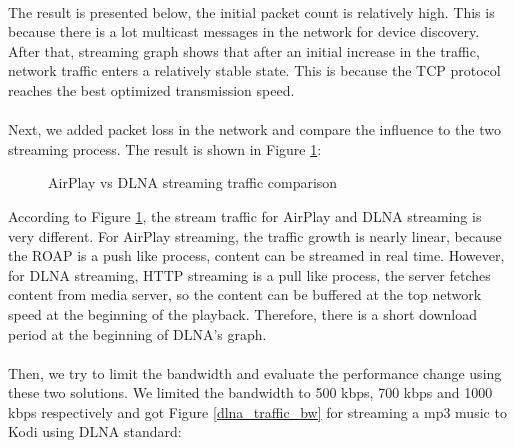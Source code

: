\\
The result is presented below, the initial packet count is relatively high. This is because there is a lot multicast messages in the network for device discovery. After that, streaming graph shows that after an initial increase in the traffic, network traffic enters a relatively stable state. This is because the TCP protocol reaches the best optimized transmission speed.\\
\\
Next, we added packet loss in the network and compare the influence to the two
streaming process. The result is shown in Figure \ref{airplay_vs_dlna_traffic}:\\
\begin{figure}
\hfill
{}
\hfill
{}
\hfill
\caption{AirPlay vs DLNA streaming traffic
comparison \label{airplay_vs_dlna_traffic}}
\end{figure}

According to Figure \ref{airplay_vs_dlna_traffic}, the stream traffic for
AirPlay and DLNA streaming is very different. For AirPlay streaming, the traffic
growth is nearly linear, because the ROAP is a push like process, content can be
streamed in real time. However, for DLNA streaming, HTTP streaming is a pull
like process, the server fetches content from media server, so the content can
be buffered at the top network speed at the beginning of the playback.
Therefore, there is a short download period at the beginning of DLNA's
graph. \\ 
\\
Then, we try to limit the bandwidth and evaluate the performance change using these two solutions. We limited the bandwidth to 500 kbps, 700 kbps and 1000 kbps respectively and got Figure \ref{dlna_traffic_bw} for streaming a mp3 music to Kodi using DLNA standard:\\

